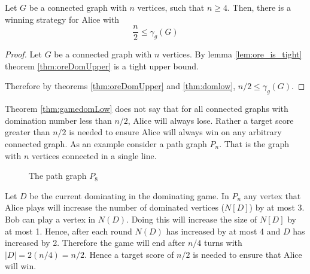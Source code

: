 \begin{theorem}[Askes] \label{thm:gamedomLow}
    Let $G$ be a connected graph with $n$ vertices, such that $n \geq 4$. Then, there is a winning strategy for Alice with    
    \[  \frac{n}{2} \leq \gamma_g(G)  \]    
\end{theorem}
\begin{proof}
    Let $G$ be a connected graph with $n$ vertices. 
    By lemma \ref{lem:ore_is_tight} theorem \ref{thm:oreDomUpper} is a tight upper bound.
        
    Therefore by theorems \ref{thm:oreDomUpper} and \ref{thm:domlow}, $ n/2 \leq \gamma_g(G)$.
\end{proof}

Theorem \ref{thm:gamedomLow} does not say that for all connected graphs with domination number less than $n/2$, Alice will always lose. Rather a target score greater than $n/2$ is needed to ensure Alice will always win on any arbitrary connected graph. As an example consider a path graph $P_n$. That is the graph with $n$ vertices connected in a single line. 
\begin{figure}[h]
    \centering
    \caption{The path graph $P_8$}
\end{figure}
Let $D$ be the current dominating in the dominating game. In $P_n$ any vertex that Alice plays will increase the number of dominated vertices ($N[D]$) by at most 3. Bob can play a vertex in $N(D)$. Doing this will increase the size of $N[D]$ by at most 1. Hence, after each round $N(D)$ has increased by at most 4 and $D$ has increased by 2. Therefore the game will end after $n/4$ turns with $|D| = 2(n/4) = n/2$. Hence a target score of $n/2$ is needed to ensure that Alice will win.


